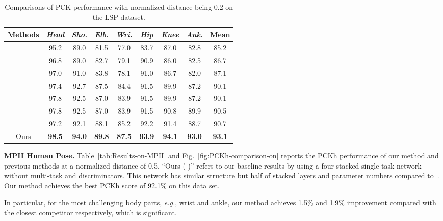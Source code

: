 \documentclass[10pt,letterpaper,twocolumn]{article}
\begin{document}
\begin{table}[t!]
	\caption{Comparisons of PCK performance with normalized distance being 0.2 on the LSP dataset.}
        \label{tab:Comparisons-of-PCK}
	\small
	\centering
	\setlength{\tabcolsep}{3.0pt}
	\begin{tabular}{|c||c|c|c|c|c|c|c||c|}
		\hline
			{Methods} & \emph{Head} & \emph{Sho.} & \emph{Elb.} & \emph{Wri.} & \emph{Hip} & \emph{Knee} & \emph{Ank.} & \textbf{Mean} \\
		\hline
		\hline
		\cite{Belagiannis2016} & 95.2   & 89.0    & 81.5  &  77.0  &  83.7   &  87.0   & 82.8  &  85.2  \\
		\cite{conf/eccv/LifshitzFU16}  & 96.8  &  89.0  &  82.7  &  79.1  &  90.9  &  86.0   & 82.5   & 86.7  \\
		\cite{conf/iccv/PishchulinAGS13}   & 97.0    & 91.0   & 83.8   & 78.1   & 91.0  &  86.7  &  82.0   & 87.1  \\
		\cite{conf/eccv/InsafutdinovPAA16}   & 97.4   & 92.7   & 87.5  &  84.4  &  91.5  &  89.9   & 87.2  &  90.1  \\
		\cite{conf/cvpr/PishchulinITAAG16}   & 97.8   & 92.5   & 87.0   & 83.9  &  91.5   & 89.9  &  87.2  &  90.1  \\
		\cite{conf/cvpr/WeiRKS16}   & 97.8   & 92.5  &  87.0  &  83.9  &  91.5   & 90.8   & 89.9   & 90.5  \\
		\cite{conf/eccv/BulatT16}   & 97.2   & 92.1   & 88.1   & 85.2   & 92.2   & 91.4  &  88.7   & 90.7  \\
		\hline
		\hline
		Ours & \textbf{98.5}& \textbf{94.0}& \textbf{89.8}& \textbf{87.5}& \textbf{93.9}& \textbf{94.1}& \textbf{93.0}&\textbf{93.1}\\
		\hline
	\end{tabular}
	\vspace{1em}
\end{table}

\noindent \textbf{MPII Human Pose.} Table~\ref{tab:Results-on-MPII} and Fig.~\ref{fig:PCKh-comparison-on} reports the PCKh performance of our method and previous methods at a normalized distance of 0.5. ``Ours (-)'' refers to our baseline results by using a four-stacked single-task network without multi-task and discriminators. This network has similar structure but half of stacked layers and parameter numbers compared to~\cite{conf/eccv/NewellYD16}. Our method achieves the best PCKh score of 92.1\% on this data set.

In particular, for the most challenging body parts, \emph{e.g.}, wrist and ankle, our method achieves 1.5\% and 1.9\% improvement compared with the closest competitor respectively, which is significant.
\end{document}
